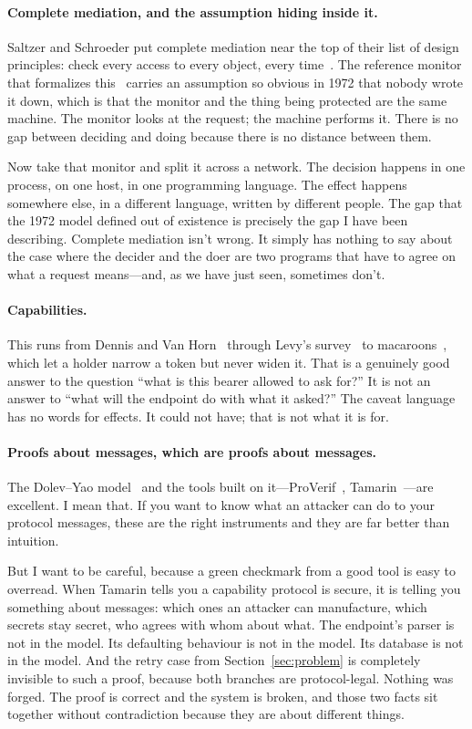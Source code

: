 \documentclass[11pt]{article}
\begin{document}
\paragraph{Complete mediation, and the assumption hiding inside it.}
Saltzer and Schroeder put complete mediation near the top of their list of
design principles: check every access to every object, every
time~\cite{saltzer1975}. The reference monitor that formalizes
this~\cite{anderson1972} carries an assumption so obvious in 1972 that nobody
wrote it down, which is that the monitor and the thing being protected are the
same machine. The monitor looks at the request; the machine performs it. There
is no gap between deciding and doing because there is no distance between them.

Now take that monitor and split it across a network. The decision happens in
one process, on one host, in one programming language. The effect happens
somewhere else, in a different language, written by different people. The gap
that the 1972 model defined out of existence is precisely the gap I have been
describing. Complete mediation isn't wrong. It simply has nothing to say about
the case where the decider and the doer are two programs that have to agree on
what a request means---and, as we have just seen, sometimes don't.

\paragraph{Capabilities.}
This runs from Dennis and Van Horn~\cite{dennis1966} through Levy's
survey~\cite{levy1984} to macaroons~\cite{birgisson2014}, which let a holder
narrow a token but never widen it. That is a genuinely good answer to the
question ``what is this bearer allowed to ask for?'' It is not an answer to
``what will the endpoint do with what it asked?'' The caveat language has no
words for effects. It could not have; that is not what it is for.

\paragraph{Proofs about messages, which are proofs about messages.}
The Dolev--Yao model~\cite{dolevyao1983} and the tools built on
it---ProVerif~\cite{blanchet2001}, Tamarin~\cite{meier2013}---are excellent.
I mean that. If you want to know what an attacker can do to your protocol
messages, these are the right instruments and they are far better than
intuition.

But I want to be careful, because a green checkmark from a good tool is easy
to overread. When Tamarin tells you a capability protocol is secure, it is
telling you something about messages: which ones an attacker can manufacture,
which secrets stay secret, who agrees with whom about what. The endpoint's
parser is not in the model. Its defaulting behaviour is not in the model. Its
database is not in the model. And the retry case from
Section~\ref{sec:problem} is completely invisible to such a proof, because
both branches are protocol-legal. Nothing was forged. The proof is correct and
the system is broken, and those two facts sit together without contradiction
because they are about different things.
\end{document}

